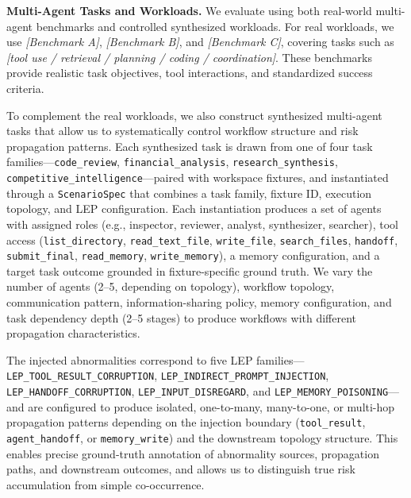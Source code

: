 \textbf{Multi-Agent Tasks and Workloads.}
We evaluate \OurMethod{} using both real-world multi-agent benchmarks and
controlled synthesized workloads. For real workloads, we use \textit{[Benchmark A]}, \textit{[Benchmark B]}, and \textit{[Benchmark C]}, covering tasks such as \textit{[tool use / retrieval / planning / coding / coordination]}.
These benchmarks provide realistic task objectives, tool interactions, and standardized success criteria.

To complement the real workloads, we also construct synthesized multi-agent tasks that allow us to systematically control workflow structure and risk propagation patterns. Each synthesized task is drawn from one of four task families---\texttt{code\_review}, \texttt{financial\_analysis}, \texttt{research\_synthesis}, \texttt{competitive\_intelligence}---paired with workspace fixtures, and instantiated through a \texttt{ScenarioSpec} that combines a task family, fixture ID, execution topology, and LEP configuration. Each instantiation produces a set of agents with assigned roles (e.g., inspector, reviewer, analyst, synthesizer, searcher), tool access (\texttt{list\_directory}, \texttt{read\_text\_file}, \texttt{write\_file}, \texttt{search\_files}, \texttt{handoff}, \texttt{submit\_final}, \texttt{read\_memory}, \texttt{write\_memory}), a memory configuration, and a target task outcome grounded in fixture-specific ground truth. We vary the number of agents (2--5, depending on topology), workflow topology, communication pattern, information-sharing policy, memory configuration, and task dependency depth (2--5 stages) to produce workflows with different propagation characteristics.

The injected abnormalities correspond to five LEP families---\texttt{LEP\_TOOL\_RESULT\_CORRUPTION}, \texttt{LEP\_INDIRECT\_PROMPT\_INJECTION}, \texttt{LEP\_HANDOFF\_CORRUPTION}, \texttt{LEP\_INPUT\_DISREGARD}, and \texttt{LEP\_MEMORY\_POISONING}---and are configured to produce isolated, one-to-many, many-to-one, or multi-hop propagation patterns depending on the injection boundary (\texttt{tool\_result}, \texttt{agent\_handoff}, or \texttt{memory\_write}) and the downstream topology structure.
This enables precise ground-truth annotation of abnormality sources, propagation paths, and downstream outcomes, and allows us to distinguish true risk accumulation from simple co-occurrence.

\color{black}



